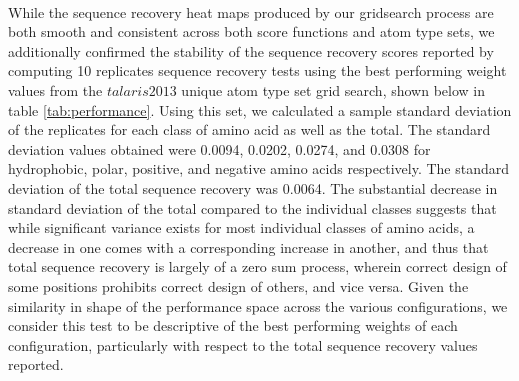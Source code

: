 \paragraph{}
While the sequence recovery heat maps produced by our gridsearch process are both smooth and consistent across both score functions and atom type sets, we additionally confirmed the stability of the sequence recovery scores reported by computing 10 replicates sequence recovery tests using the best performing weight values from the $talaris2013$ unique atom type set grid search, shown below in table \ref{tab:performance}.
Using this set, we calculated a sample standard deviation of the replicates for each class of amino acid as well as the total. 
The standard deviation values obtained were 0.0094, 0.0202, 0.0274, and 0.0308 for hydrophobic, polar, positive, and negative amino acids respectively.
The standard deviation of the total sequence recovery was 0.0064.
The substantial decrease in standard deviation of the total compared to the individual classes suggests that while significant variance exists for most individual classes of amino acids, a decrease in one comes with a corresponding increase in another, and thus that total sequence recovery is largely of a zero sum process, wherein correct design of some positions prohibits correct design of others, and vice versa.
Given the similarity in shape of the performance space across the various configurations, we consider this test to be descriptive of the best performing weights of each configuration, particularly with respect to the total sequence recovery values reported.

